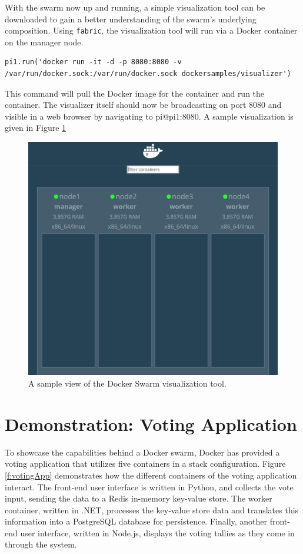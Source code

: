 \documentclass[sigconf]{acmart}
\begin{document}
With the swarm now up and running, a simple visualization tool can be downloaded to gain a better understanding of the swarm's underlying composition. Using {\tt fabric}, the visualization tool will run via a Docker container on the manager node.

\begin{lstlisting}
pi1.run('docker run -it -d -p 8080:8080 -v /var/run/docker.sock:/var/run/docker.sock dockersamples/visualizer')
\end{lstlisting}

\setlength{\parskip}{1em}\noindent This command will pull the Docker image for the container and run the container. The visualizer itself should now be broadcasting on port 8080 and visible in a web browser by navigating to pi@pi1:8080. A sample visualization is given in Figure \ref{f:visualizer}
\begin{figure}[!ht]
  \centering\includegraphics[width=\columnwidth]{images/visualizer.png}
  \caption{A sample view of the Docker Swarm visualization tool.}\label{f:visualizer}
\end{figure}

\section{Demonstration: Voting Application}

To showcase the capabilities behind a Docker swarm, Docker has provided a voting application that utilizes five containers in a stack configuration\cite{votingapp2017}. Figure \ref{f:votingApp} demonstrates how the different containers of the voting application interact. The front-end user interface is written in Python, and collects the vote input, sending the data to a Redis in-memory key-value store. The worker container, written in .NET, processes the key-value store data and translates this information into a PostgreSQL database for persistence. Finally, another front-end user interface, written in Node.js, displays the voting tallies as they come in through the system.
\end{document}
